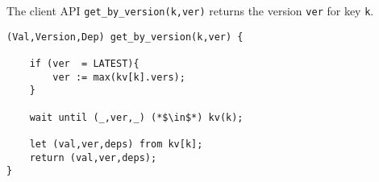 The client API \verb|get_by_version(k,ver)| returns the version \verb|ver| for key \verb|k|.

\begin{lstlisting}[caption={Receive update message},label={lst:cops-replica-receive-msg}]
(Val,Version,Dep) get_by_version(k,ver) {

    if (ver  = LATEST){
        ver := max(kv[k].vers);
    }

    wait until (_,ver,_) (*$\in$*) kv(k);
    
    let (val,ver,deps) from kv[k];
    return (val,ver,deps);
}
\end{lstlisting}
